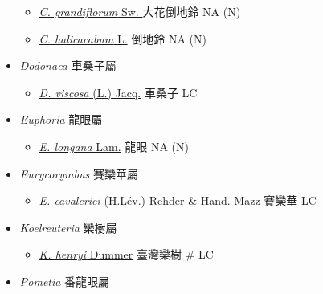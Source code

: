 \begin{itemize}
  \begin{itemize}
        \item[] \href{http://www.theplantlist.org/tpl1.1/search?q=Cardiospermum+grandiflorum}{\textit{C. grandiflorum} Sw. }   大花倒地鈴   NA (N)
        \item[] \href{http://www.theplantlist.org/tpl1.1/search?q=Cardiospermum+halicacabum}{\textit{C. halicacabum} L.}   倒地鈴   NA (N)
  \end{itemize}
 \item[] \textit{Dodonaea} 車桑子屬
                                
  \begin{itemize}
        \item[] \href{http://www.theplantlist.org/tpl1.1/search?q=Dodonaea+viscosa}{\textit{D. viscosa} (L.) Jacq.}   車桑子   LC
  \end{itemize}
 \item[] \textit{Euphoria} 龍眼屬
                                
  \begin{itemize}
        \item[] \href{http://www.theplantlist.org/tpl1.1/search?q=Euphoria+longana}{\textit{E. longana} Lam.}   龍眼   NA (N)
  \end{itemize}
 \item[] \textit{Eurycorymbus} 賽欒華屬
                                
  \begin{itemize}
        \item[] \href{http://www.theplantlist.org/tpl1.1/search?q=Eurycorymbus+cavaleriei}{\textit{E. cavaleriei} (H.Lév.) Rehder \& Hand.-Mazz}   賽欒華   LC
  \end{itemize}
 \item[] \textit{Koelreuteria} 欒樹屬
                                
  \begin{itemize}
        \item[] \href{http://www.theplantlist.org/tpl1.1/search?q=Koelreuteria+henryi}{\textit{K. henryi} Dummer}   臺灣欒樹  \# LC
  \end{itemize}
 \item[] \textit{Pometia} 番龍眼屬
                                

\end{itemize}

